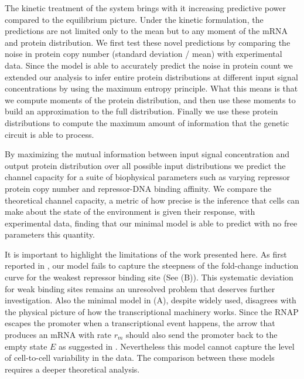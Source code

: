 The kinetic treatment of the system brings with it increasing predictive power
compared to the equilibrium picture. Under the kinetic formulation, the
predictions are not limited only to the mean but to any moment of the mRNA and
protein distribution. We first test these novel predictions by comparing the
noise in protein copy number (standard deviation / mean) with experimental data.
Since the model is able to accurately predict the noise in protein count we
extended our analysis to infer entire protein distributions at different input
signal concentrations by using the maximum entropy principle. What this means is
that we compute moments of the protein distribution, and then use these
moments to build an approximation to the full distribution. Finally we use these
protein distributions to compute the maximum amount of information that the
genetic circuit is able to process.

By maximizing the mutual information between input signal concentration and
output protein distribution over all possible input distributions we predict
the channel capacity for a suite of biophysical parameters such as varying
repressor protein copy number and repressor-DNA binding affinity. We compare
the theoretical channel capacity, a metric of how precise is the inference that
cells can make about the state of the environment is given their response, with
experimental data, finding that our minimal model is able to predict with no
free parameters this quantity.

It is important to highlight the limitations of the work presented here. As
first reported in \cite{Razo-Mejia2018}, our model fails to capture the
steepness of the fold-change induction curve for the weakest repressor binding
site (See (B)). This systematic deviation for weak binding
sites remains an unresolved problem that deserves further investigation. Also
the minimal model in (A), despite widely used,
disagrees with the physical picture of how the transcriptional machinery works.
Since the RNAP escapes the promoter when a transcriptional event happens, the
arrow that produces an mRNA with rate $r_m$ should also send the promoter back
to the empty state $E$ as suggested in \cite{Phillips2015}. Nevertheless this
model cannot capture the level of cell-to-cell variability in the data. The
comparison between these models requires a deeper theoretical analysis.

